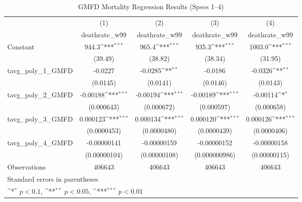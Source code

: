 \begin{table}[htbp]\centering
\def\sym#1{\ifmmode^{#1}\else\(^{#1}\)\fi}
\caption{GMFD Mortality Regression Results (Specs 1–4)}
\begin{tabular}{l*{4}{c}}
\hline\hline
                    &\multicolumn{1}{c}{(1)}&\multicolumn{1}{c}{(2)}&\multicolumn{1}{c}{(3)}&\multicolumn{1}{c}{(4)}\\
                    &\multicolumn{1}{c}{deathrate\_w99}&\multicolumn{1}{c}{deathrate\_w99}&\multicolumn{1}{c}{deathrate\_w99}&\multicolumn{1}{c}{deathrate\_w99}\\
\hline
Constant            &       944.3\sym{***}&       965.4\sym{***}&       935.3\sym{***}&      1003.0\sym{***}\\
                    &     (39.49)         &     (38.82)         &     (38.34)         &     (31.95)         \\
[1em]
tavg\_poly\_1\_GMFD    &     -0.0227         &     -0.0285\sym{**} &     -0.0186         &     -0.0326\sym{**} \\
                    &    (0.0145)         &    (0.0141)         &    (0.0146)         &    (0.0143)         \\
[1em]
tavg\_poly\_2\_GMFD    &    -0.00188\sym{***}&    -0.00194\sym{***}&    -0.00189\sym{***}&    -0.00114\sym{*}  \\
                    &  (0.000643)         &  (0.000672)         &  (0.000597)         &  (0.000658)         \\
[1em]
tavg\_poly\_3\_GMFD    &    0.000123\sym{***}&    0.000134\sym{***}&    0.000120\sym{***}&    0.000126\sym{***}\\
                    & (0.0000453)         & (0.0000480)         & (0.0000439)         & (0.0000406)         \\
[1em]
tavg\_poly\_4\_GMFD    & -0.00000141         & -0.00000159         & -0.00000152         & -0.00000158         \\
                    &(0.00000104)         &(0.00000108)         &(0.000000986)         &(0.00000115)         \\
\hline
Observations        &      406643         &      406643         &      406643         &      406643         \\
\hline\hline
\multicolumn{5}{l}{\footnotesize Standard errors in parentheses}\\
\multicolumn{5}{l}{\footnotesize \sym{*} \(p<0.1\), \sym{**} \(p<0.05\), \sym{***} \(p<0.01\)}\\
\end{tabular}
\end{table}
